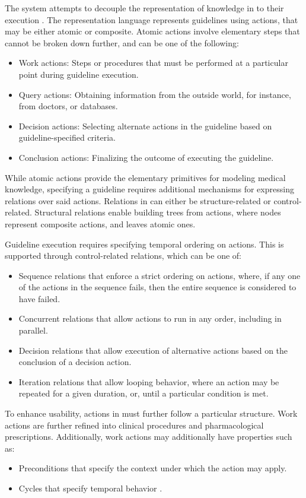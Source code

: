 The \GLARE{} system attempts to decouple the representation of knowledge
in \BPGs{} to their execution \cite{TerenzianiAIM01}. The \GLARE{} representation
language represents guidelines using actions, that may be either atomic or
composite. Atomic actions involve elementary steps that cannot be broken
down further, and can be one of the following:
\begin{itemize}
  \item Work actions: Steps or procedures that must be
    performed at a particular point during guideline execution.
  \item Query actions: Obtaining information from the outside world,
    for instance, from doctors, or databases.
  \item Decision actions: Selecting alternate actions in the guideline
    based on guideline-specified criteria.
  \item Conclusion actions: Finalizing the outcome of
    executing the guideline.
\end{itemize}
While atomic actions provide the elementary primitives for modeling
medical knowledge, specifying a guideline requires additional mechanisms for
expressing relations over said actions. Relations in
\GLARE{} can either be structure-related or control-related.
Structural relations enable building trees from actions, where
nodes represent composite actions, and leaves atomic ones.

Guideline execution requires specifying temporal ordering on
actions. This is supported through control-related relations, which
can be one of:
\begin{itemize}
  \item Sequence relations that enforce a strict ordering on actions, where,
    if any one of the actions in the sequence fails, then the entire sequence
    is considered to have failed.
  \item Concurrent relations that allow actions to run in any order, including
    in parallel.
  \item Decision relations that allow execution of alternative actions based
    on the conclusion of a decision action.
  \item Iteration relations that allow looping behavior, where
    an action may be repeated for a given duration, or, until a particular
    condition is met.
\end{itemize}

To enhance usability, actions in \GLARE{} must further follow a particular
structure. Work actions are further refined into clinical procedures and
pharmacological prescriptions. Additionally, work actions may additionally
have properties such as:
\begin{itemize}
  \item Preconditions that specify the context under which the action may apply.
  \item Cycles that specify temporal behavior \cite{TerenzianiAIM01}.
\end{itemize}

